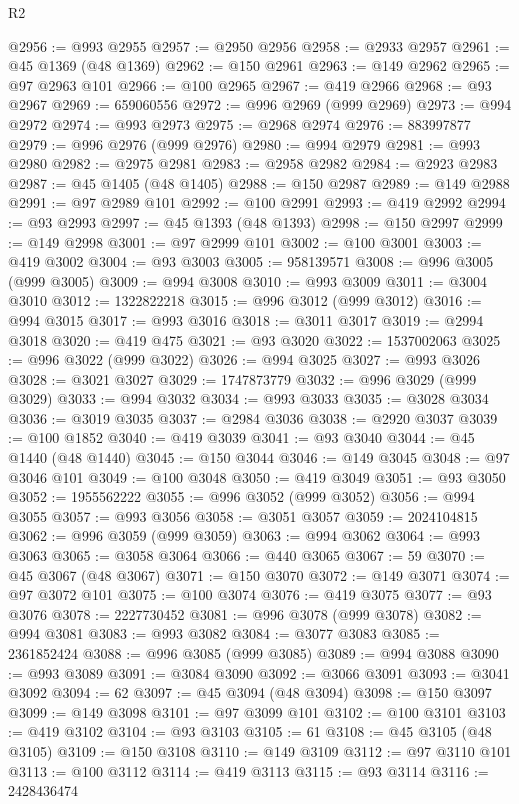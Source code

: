 \begin{lexlean}{R2}
\begin{coremodule}
@2956 := @993 @2955
@2957 := @2950 @2956
@2958 := @2933 @2957
@2961 := @45 @1369 (@48 @1369)
@2962 := @150 @2961
@2963 := @149 @2962
@2965 := @97 @2963 @101
@2966 := @100 @2965
@2967 := @419 @2966
@2968 := @93 @2967
@2969 := 659060556
@2972 := @996 @2969 (@999 @2969)
@2973 := @994 @2972
@2974 := @993 @2973
@2975 := @2968 @2974
@2976 := 883997877
@2979 := @996 @2976 (@999 @2976)
@2980 := @994 @2979
@2981 := @993 @2980
@2982 := @2975 @2981
@2983 := @2958 @2982
@2984 := @2923 @2983
@2987 := @45 @1405 (@48 @1405)
@2988 := @150 @2987
@2989 := @149 @2988
@2991 := @97 @2989 @101
@2992 := @100 @2991
@2993 := @419 @2992
@2994 := @93 @2993
@2997 := @45 @1393 (@48 @1393)
@2998 := @150 @2997
@2999 := @149 @2998
@3001 := @97 @2999 @101
@3002 := @100 @3001
@3003 := @419 @3002
@3004 := @93 @3003
@3005 := 958139571
@3008 := @996 @3005 (@999 @3005)
@3009 := @994 @3008
@3010 := @993 @3009
@3011 := @3004 @3010
@3012 := 1322822218
@3015 := @996 @3012 (@999 @3012)
@3016 := @994 @3015
@3017 := @993 @3016
@3018 := @3011 @3017
@3019 := @2994 @3018
@3020 := @419 @475
@3021 := @93 @3020
@3022 := 1537002063
@3025 := @996 @3022 (@999 @3022)
@3026 := @994 @3025
@3027 := @993 @3026
@3028 := @3021 @3027
@3029 := 1747873779
@3032 := @996 @3029 (@999 @3029)
@3033 := @994 @3032
@3034 := @993 @3033
@3035 := @3028 @3034
@3036 := @3019 @3035
@3037 := @2984 @3036
@3038 := @2920 @3037
@3039 := @100 @1852
@3040 := @419 @3039
@3041 := @93 @3040
@3044 := @45 @1440 (@48 @1440)
@3045 := @150 @3044
@3046 := @149 @3045
@3048 := @97 @3046 @101
@3049 := @100 @3048
@3050 := @419 @3049
@3051 := @93 @3050
@3052 := 1955562222
@3055 := @996 @3052 (@999 @3052)
@3056 := @994 @3055
@3057 := @993 @3056
@3058 := @3051 @3057
@3059 := 2024104815
@3062 := @996 @3059 (@999 @3059)
@3063 := @994 @3062
@3064 := @993 @3063
@3065 := @3058 @3064
@3066 := @440 @3065
@3067 := 59
@3070 := @45 @3067 (@48 @3067)
@3071 := @150 @3070
@3072 := @149 @3071
@3074 := @97 @3072 @101
@3075 := @100 @3074
@3076 := @419 @3075
@3077 := @93 @3076
@3078 := 2227730452
@3081 := @996 @3078 (@999 @3078)
@3082 := @994 @3081
@3083 := @993 @3082
@3084 := @3077 @3083
@3085 := 2361852424
@3088 := @996 @3085 (@999 @3085)
@3089 := @994 @3088
@3090 := @993 @3089
@3091 := @3084 @3090
@3092 := @3066 @3091
@3093 := @3041 @3092
@3094 := 62
@3097 := @45 @3094 (@48 @3094)
@3098 := @150 @3097
@3099 := @149 @3098
@3101 := @97 @3099 @101
@3102 := @100 @3101
@3103 := @419 @3102
@3104 := @93 @3103
@3105 := 61
@3108 := @45 @3105 (@48 @3105)
@3109 := @150 @3108
@3110 := @149 @3109
@3112 := @97 @3110 @101
@3113 := @100 @3112
@3114 := @419 @3113
@3115 := @93 @3114
@3116 := 2428436474

\end{coremodule}
\end{lexlean}
